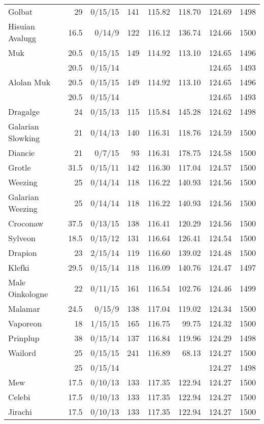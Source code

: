 \begin{longtable}{lrrrrrrr}
Golbat & 29 & 0/15/15 & 141 & 115.82 & 118.70 & 124.69 & 1498\\
Hisuian Avalugg & 16.5 & 0/14/9 & 122 & 116.12 & 136.74 & 124.66 & 1500\\
Muk & 20.5 & 0/15/15 & 149 & 114.92 & 113.10 & 124.65 & 1496\\
 & 20.5 & 0/15/14 & & & & 124.65 & 1493\\
Alolan Muk & 20.5 & 0/15/15 & 149 & 114.92 & 113.10 & 124.65 & 1496\\
 & 20.5 & 0/15/14 & & & & 124.65 & 1493\\
Dragalge & 24 & 0/15/13 & 115 & 115.84 & 145.28 & 124.62 & 1498\\
Galarian Slowking & 21 & 0/14/13 & 140 & 116.31 & 118.76 & 124.59 & 1500\\
Diancie & 21 & 0/7/15 & 93 & 116.31 & 178.75 & 124.58 & 1500\\
Grotle & 31.5 & 0/15/11 & 142 & 116.30 & 117.04 & 124.57 & 1500\\
Weezing & 25 & 0/14/14 & 118 & 116.22 & 140.93 & 124.56 & 1500\\
Galarian Weezing & 25 & 0/14/14 & 118 & 116.22 & 140.93 & 124.56 & 1500\\
Croconaw & 37.5 & 0/13/15 & 138 & 116.41 & 120.29 & 124.56 & 1500\\
Sylveon & 18.5 & 0/15/12 & 131 & 116.64 & 126.41 & 124.54 & 1500\\
Drapion & 23 & 2/15/14 & 119 & 116.60 & 139.02 & 124.48 & 1500\\
Klefki & 29.5 & 0/15/14 & 118 & 116.09 & 140.76 & 124.47 & 1497\\
Male Oinkologne & 22 & 0/11/15 & 161 & 116.54 & 102.76 & 124.46 & 1499\\
Malamar & 24.5 & 0/15/9 & 138 & 117.04 & 119.02 & 124.34 & 1500\\
Vaporeon & 18 & 1/15/15 & 165 & 116.75 & 99.75 & 124.32 & 1500\\
Prinplup & 38 & 0/15/14 & 137 & 116.84 & 119.96 & 124.29 & 1498\\
Wailord & 25 & 0/15/15 & 241 & 116.89 & 68.13 & 124.27 & 1500\\
 & 25 & 0/15/14 & & & & 124.27 & 1498\\
Mew & 17.5 & 0/10/13 & 133 & 117.35 & 122.94 & 124.27 & 1500\\
Celebi & 17.5 & 0/10/13 & 133 & 117.35 & 122.94 & 124.27 & 1500\\
Jirachi & 17.5 & 0/10/13 & 133 & 117.35 & 122.94 & 124.27 & 1500\\

\end{longtable}
